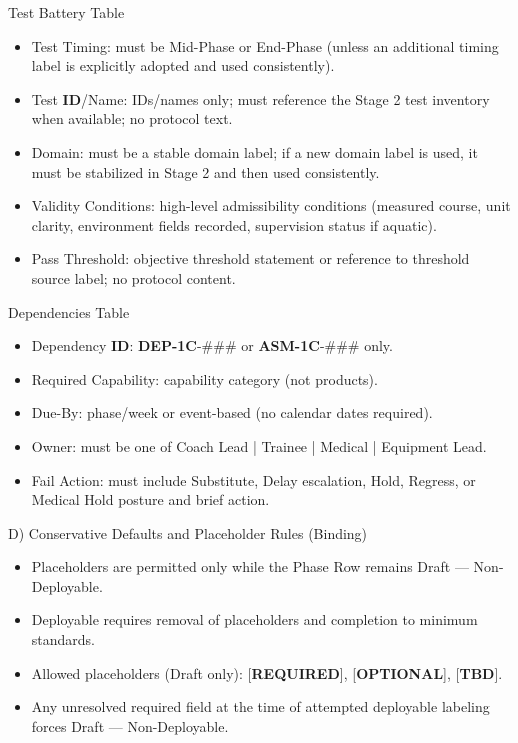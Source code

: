 \documentclass[10pt]{article}
\begin{document}
Test Battery Table

\begin{itemize}
\item Test Timing: must be Mid-Phase or End-Phase (unless an additional timing label is explicitly adopted and used consistently).
\item Test \textbf{ID}/Name: IDs/names only; must reference the Stage 2 test inventory when available; no protocol text.
\item Domain: must be a stable domain label; if a new domain label is used, it must be stabilized in Stage 2 and then used consistently.
\item Validity Conditions: high-level admissibility conditions (measured course, unit clarity, environment fields recorded, supervision status if aquatic).
\item Pass Threshold: objective threshold statement or reference to threshold source label; no protocol content.
\end{itemize}

Dependencies Table

\begin{itemize}
\item Dependency \textbf{ID}: \textbf{DEP-1C}-\#\#\# or \textbf{ASM-1C}-\#\#\# only.
\item Required Capability: capability category (not products).
\item Due-By: phase/week or event-based (no calendar dates required).
\item Owner: must be one of Coach Lead | Trainee | Medical | Equipment Lead.
\item Fail Action: must include Substitute, Delay escalation, Hold, Regress, or Medical Hold posture and brief action.
\end{itemize}

D) Conservative Defaults and Placeholder Rules (Binding)

\begin{itemize}
\item Placeholders are permitted only while the Phase Row remains Draft — Non-Deployable.
\item Deployable requires removal of placeholders and completion to minimum standards.
\item Allowed placeholders (Draft only): [\textbf{REQUIRED}], [\textbf{OPTIONAL}], [\textbf{TBD}].
\item Any unresolved required field at the time of attempted deployable labeling forces Draft — Non-Deployable.
\end{itemize}
\end{document}
